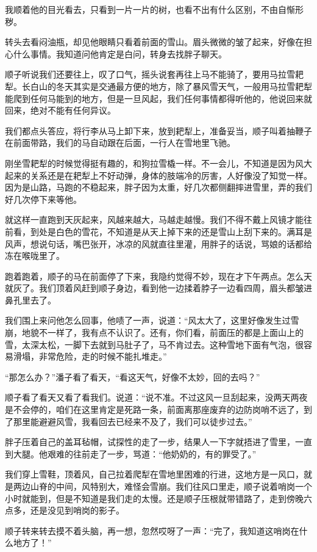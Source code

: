 我顺着他的目光看去，只看到一片一片的树，也看不出有什么区别，不由自惭形秽。

转头去看闷油瓶，却见他眼睛只看着前面的雪山。眉头微微的皱了起来，好像在担心什么事情。我知道问他肯定是白问，转身去找胖子聊天。

顺子听说我们还要往上，叹了口气，摇头说套再往上马不能骑了，要用马拉雪耙犁。长白山的冬天其实是交通最方便的地方，除了暴风雪天气，一般用马拉雪耙犁能爬到任何马能到的地方，但是一旦风起，我们任何事情都得听他的，他说回来就回来，绝对不能有任何异议。

我们都点头答应，将行李从马上卸下来，放到耙犁上，准备妥当，顺子叫着抽鞭子在前面带路，我们的马自动跟在后面，一行人在雪地里飞驰。

刚坐雪耙犁的时候觉得挺有趣的，和狗拉雪橇一样。不一会儿，不知道是因为风大起来的关系还是在耙犁上不好动弹，身体的肢端冷的厉害，人好像没了知觉一样。因为是山路，马跑的不稳起来，胖子因为太重，好几次都侧翻摔进雪里，弄的我们好几次停下来等他。

就这样一直跑到天灰起来，风越来越大，马越走越慢。我们不得不戴上风镜才能往前看，到处是白色的雪花，不知道是从天上掉下来的还是雪山上刮下来的。满耳是风声，想说句话，嘴巴张开，冰凉的风就直往里灌，用胖子的话说，骂娘的话都给冻在喉咙里了。

跑着跑着，顺子的马在前面停了下来，我隐约觉得不妙，现在才下午两点。怎么天就灰了。我们顶着风赶到顺子身边，看到他一边揉着脖子一边看四周，眉头都皱进鼻孔里去了。

我们围上来问他怎么回事，他啧了一声，说道：“风太大了，这里好像发生过雪崩，地貌不一样了，我有点不认识了。还有，你们看，前面压的都是上面山上的雪，太深太松，一脚下去就到马肚子了，马不肯过去。这种雪地下面有气泡，很容易滑塌，非常危险，走的时候不能扎堆走。”

“那怎么办？”潘子看了看天，“看这天气，好像不太妙，回的去吗？”

顺子看了看天又看了看我们。说道：“说不准。不过这风一旦刮起来，没两天两夜是不会停的，咱们在这里肯定是死路一条，前面离那座废弃的边防岗哨不远了，到了那里能避避风雪，我看回去已经来不及了，我们可以徒步过去。”

胖子压着自己的盖耳毡帽，试探性的走了一步，结果人一下字就捂进了雪里，一直到大腿。他艰难的往前走了一步，骂道：“他奶奶的，有的罪受了。”

我们穿上雪鞋，顶着风，自己拉着爬犁在雪地里困难的行进，这地方是一风口，就是两边山脊的中间，风特别大，难怪会雪崩。我们往风口里走，顺子说着哨岗一个小时就能到，但是不知道是我们走的太慢。还是顺子压根就带错路了，走到傍晚六点多，还是没见到哨岗的影子。

顺子转来转去摸不着头脑，再一想，忽然哎呀了一声：“完了，我知道这哨岗在什么地方了！”

